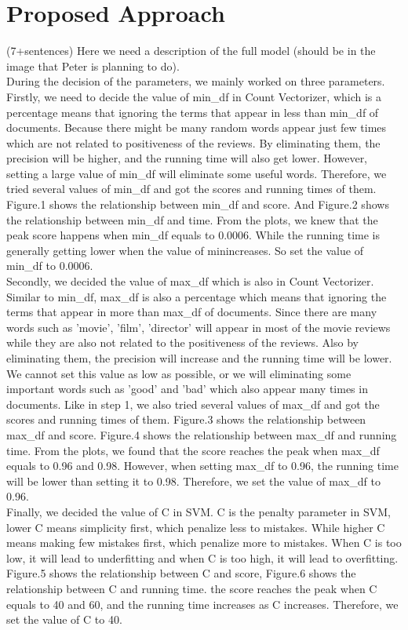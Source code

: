 \documentclass{amsart}
\theoremstyle{definition}
\theoremstyle{remark}
\numberwithin{equation}{section}
\begin{document}
\section{Proposed Approach}(7+sentences)
Here we need a description of the full model (should be in the image that Peter is planning to do).\\
During the decision of the parameters, we mainly worked on three parameters. Firstly, we need to decide the value of min\_df in Count Vectorizer, which is a percentage means that ignoring the terms that appear in less than min\_df of documents. Because there might be many random words appear just few times which are not related to positiveness of the reviews. By eliminating them, the precision will be higher, and the running time will also get lower. However, setting a large value of min\_df will eliminate some useful words. Therefore, we tried several values of min\_df and got the scores and running times of them. Figure.1 shows the relationship between min\_df and score. And Figure.2 shows the relationship between min\_df and time. From the plots, we knew that the peak score happens when min\_df equals to 0.0006. While the running time is generally getting lower when the value of min\df increases. So set the value of min\_df to 0.0006.\\ 
Secondly, we decided the value of max\_df which is also in Count Vectorizer. Similar to min\_df, max\_df is also a percentage which means that ignoring the terms that appear in more than max\_df of documents. Since there are many words such as 'movie', 'film', 'director' will appear in most of the movie reviews while they are also not related to the positiveness of the reviews. Also by eliminating them, the precision will increase and the running time will be lower. We cannot set this value as low as possible, or we will eliminating some important words such as 'good' and 'bad' which also appear many times in documents. Like in step 1, we also tried several values of max\_df and got the scores and running times of them. Figure.3 shows the relationship between max\_df and score. Figure.4 shows the relationship between max\_df and running time. From the plots, we found that the score reaches the peak when max\_df equals to 0.96 and 0.98. However, when setting max\_df to 0.96, the running time will be lower than setting it to 0.98. Therefore, we set the value of max\_df to 0.96.\\ 
Finally, we decided the value of C in SVM. C is the penalty parameter in SVM, lower C means simplicity first, which penalize less to mistakes. While higher C means making few mistakes first, which penalize more to mistakes. When C is too low, it will lead to underfitting and when C is too high, it will lead to overfitting. Figure.5 shows the relationship between C and score, Figure.6 shows the relationship between C and running time. the score reaches the peak when C equals to 40 and 60, and the running time increases as C increases. Therefore, we set the value of C to 40.\\   
\end{document}
